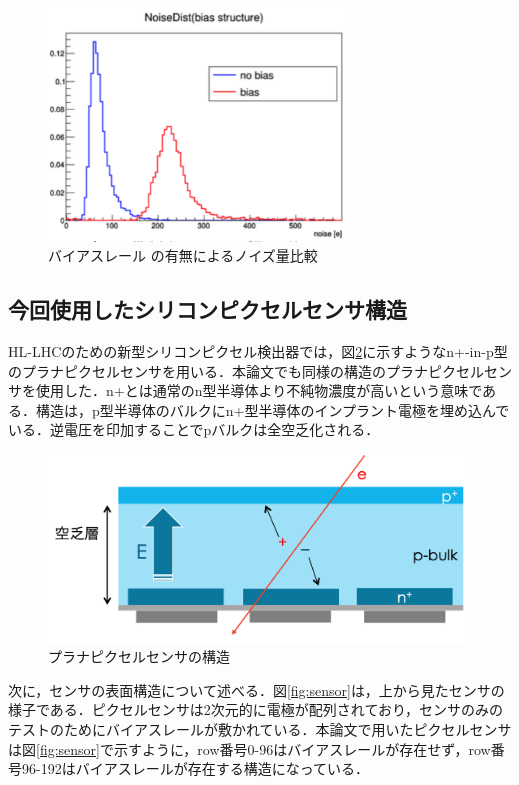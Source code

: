 \begin{figure}[h]
  \centering
  \includegraphics[width=8cm]{./figure/noisedist.png}
  \caption{バイアスレール の有無によるノイズ量比較\cite{uchiyama}}
  \label{fig:bias}
\end{figure}

\subsection{今回使用したシリコンピクセルセンサ構造}
HL-LHCのための新型シリコンピクセル検出器では，図\ref{fig:pixelsensor}に示すようなn+-in-p型のプラナピクセルセンサを用いる．本論文でも同様の構造のプラナピクセルセンサを使用した．n+とは通常のn型半導体より不純物濃度が高いという意味である．構造は，p型半導体のバルクにn+型半導体のインプラント電極を埋め込んでいる．逆電圧を印加することでpバルクは全空乏化される．

\begin{figure}[h]
  \centering
  \includegraphics[width=11cm]{./figure/pixelsensor.png}
  \caption{プラナピクセルセンサの構造}
  \label{fig:pixelsensor}
\end{figure}

次に，センサの表面構造について述べる．図\ref{fig:sensor}は，上から見たセンサの様子である．ピクセルセンサは2次元的に電極が配列されており，センサのみのテストのためにバイアスレールが敷かれている．本論文で用いたピクセルセンサは図\ref{fig:sensor}で示すように，row番号0-96はバイアスレールが存在せず，row番号96-192はバイアスレールが存在する構造になっている．

